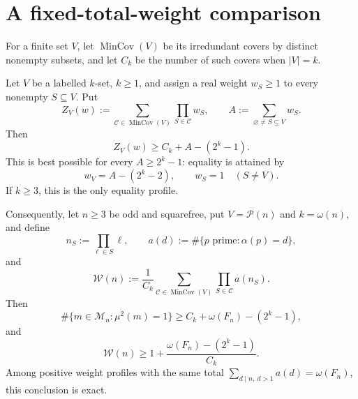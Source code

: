 \section{A fixed-total-weight comparison}

For a finite set $V$, let $\operatorname{MinCov}(V)$ be its irredundant
covers by distinct nonempty subsets, and let $C_k$ be the number of such
covers when $|V|=k$.

\begin{proposition}
\label{prop:sharp-cumulative-data-obstruction}
Let $V$ be a labelled $k$-set, $k\geq1$, and assign a real weight
$w_S\geq1$ to every nonempty $S\subseteq V$.  Put
\[
 Z_V(w):=\sum_{\mathcal C\in\operatorname{MinCov}(V)}
              \prod_{S\in\mathcal C}w_S,
 \qquad A:=\sum_{\varnothing\ne S\subseteq V}w_S.
\]
Then
\begin{equation}\label{eq:sharp-total-mass-cover-bound}
 Z_V(w)\geq C_k+A-(2^k-1).
\end{equation}
This is best possible for every $A\geq2^k-1$: equality is attained by
\[
 w_V=A-(2^k-2),\qquad w_S=1\quad(S\ne V).
\]
If $k\geq3$, this is the only equality profile.

Consequently, let $n\geq3$ be odd and squarefree, put
$V=\mathcal P(n)$ and $k=\omega(n)$, and define
\[
 n_S:=\prod_{\ell\in S}\ell,\qquad
 a(d):=\#\{p\text{ prime}:\alpha(p)=d\},
\]
and
\[
 \mathcal W(n):=\frac1{C_k}
 \sum_{\mathcal C\in\operatorname{MinCov}(V)}
 \prod_{S\in\mathcal C}a(n_S).
\]
Then
\begin{equation}\label{eq:squarefree-cumulative-rank-pure-bound}
 \#\{m\in\mathcal M_n:\mu^2(m)=1\}
 \geq C_k+\omega(F_n)-(2^k-1),
\end{equation}
and
\begin{equation}\label{eq:squarefree-cumulative-weighted-excess}
 \mathcal W(n)\geq
 1+\frac{\omega(F_n)-(2^k-1)}{C_k}.
\end{equation}
Among positive weight profiles with the same total
$\sum_{d\mid n,\ d>1}a(d)=\omega(F_n)$, this conclusion is exact.
\end{proposition}

